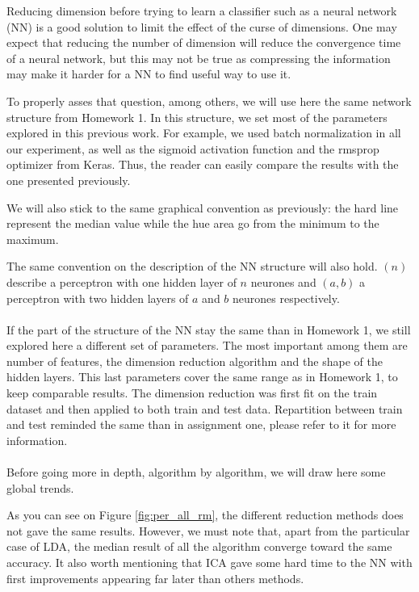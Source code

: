 \documentclass[twocolumn,a4paper,10pt]{article}
\begin{document}
Reducing dimension before trying to learn a classifier such as a neural
network (NN) is a good solution to limit the effect of the curse of
dimensions. One may expect that reducing the number of dimension will
reduce the convergence time of a neural network, but this may not
be true as compressing the information may make it harder for a NN
to find useful way to use it.

To properly asses that question, among others, we will use here the
same network structure from Homework 1. In this structure, we set
most of the parameters explored in this previous work. For example,
we used batch normalization in all our experiment, as well as the
sigmoid activation function and the rmsprop optimizer from Keras.
Thus, the reader can easily compare the results with the one presented
previously.

We will also stick to the same graphical convention as previously:
the hard line represent the median value while the hue area go from
the minimum to the maximum.

The same convention on the description of the NN structure will also
hold. $(n)$ describe a perceptron with one hidden layer of $n$ neurones
and $(a,b)$ a perceptron with two hidden layers of $a$ and $b$
neurones respectively.

\paragraph{}

If the part of the structure of the NN stay the same than in Homework
1, we still explored here a different set of parameters. The most
important among them are number of features, the dimension reduction
algorithm and the shape of the hidden layers. This last parameters
cover the same range as in Homework 1, to keep comparable results.
The dimension reduction was first fit on the train dataset and then
applied to both train and test data. Repartition between train and
test reminded the same than in assignment one, please refer to it
for more information.

\paragraph{}

Before going more in depth, algorithm by algorithm, we will draw here
some global trends.

As you can see on Figure \ref{fig:per_all_rm}, the different reduction
methods does not gave the same results. However, we must note that,
apart from the particular case of LDA, the median result of all the
algorithm converge toward the same accuracy. It also worth mentioning
that ICA gave some hard time to the NN with first improvements appearing
far later than others methods.
\end{document}
